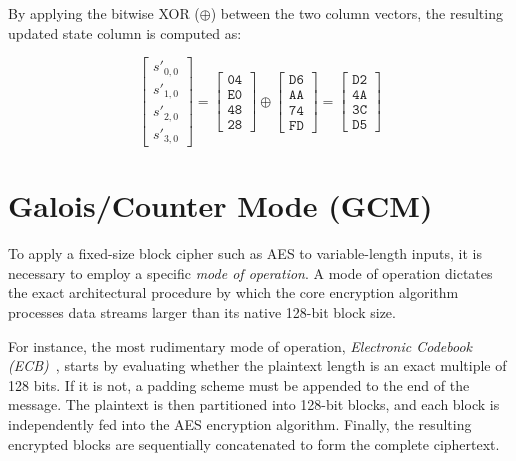 \documentclass[11pt,a4paper]{report}
\begin{document}
By applying the bitwise XOR ($\oplus$) between the two column vectors, the resulting updated state column is computed as:

\begin{equation}
\begin{bmatrix} 
    s'_{0,0} \\ 
    s'_{1,0} \\ 
    s'_{2,0} \\ 
    s'_{3,0} 
\end{bmatrix} 
= 
\begin{bmatrix} 
    \texttt{04} \\ 
    \texttt{E0} \\ 
    \texttt{48} \\ 
    \texttt{28} 
\end{bmatrix} 
\oplus 
\begin{bmatrix} 
    \texttt{D6} \\ 
    \texttt{AA} \\ 
    \texttt{74} \\ 
    \texttt{FD} 
\end{bmatrix}
=
\begin{bmatrix} 
    \texttt{D2} \\ 
    \texttt{4A} \\ 
    \texttt{3C} \\ 
    \texttt{D5} 
\end{bmatrix}
\end{equation}

\section{Galois/Counter Mode (GCM)}
To apply a fixed-size block cipher such as AES to variable-length inputs, it is necessary to employ a specific \textit{mode of operation}. 
A mode of operation dictates the exact architectural procedure by which the core encryption algorithm processes data streams larger than its native 128-bit block size.

For instance, the most rudimentary mode of operation, \textit{Electronic Codebook (ECB)}~\cite[p. 9]{ECB_CTR}, starts by evaluating whether the plaintext length is an exact multiple of 128 bits.
If it is not, a padding scheme must be appended to the end of the message. The plaintext is then partitioned into 128-bit blocks, and each block is independently fed into the AES encryption algorithm. 
Finally, the resulting encrypted blocks are sequentially concatenated to form the complete ciphertext.
\end{document}
